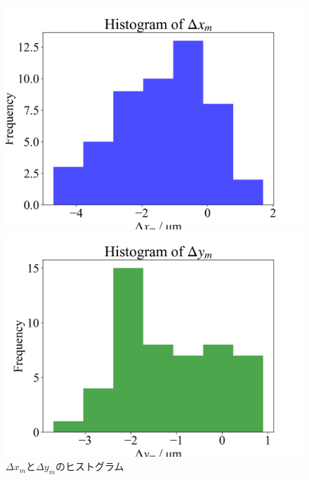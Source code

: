 \begin{figure}[htbp]
    \centering
    \begin{minipage}[b]{0.45\linewidth}
        \centering
        \includegraphics[keepaspectratio, width=\linewidth]{src/figures/delta-x-y-histogram/delta-x-histogram.png}
    \end{minipage}
    \begin{minipage}[b]{0.45\linewidth}
        \centering
        \includegraphics[width=\linewidth]{src/figures/delta-x-y-histogram/delta-y-histogram.png}
    \end{minipage}
    \caption{$\Delta x_m$と$\Delta y_m$のヒストグラム} \label{fig:delta-x-y-histogram}
\end{figure}
